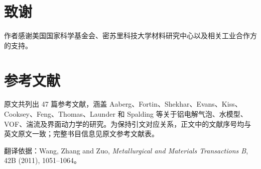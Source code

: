 \documentclass[UTF8,zihao=-4,fontset=fandol]{ctexart}
\begin{document}
\section*{致谢}
作者感谢美国国家科学基金会、密苏里科技大学材料研究中心以及相关工业合作方的支持。

\section*{参考文献}
\small 原文共列出 47 篇参考文献，涵盖 Aaberg、Fortin、Shekhar、Evans、Kiss、Cooksey、Feng、Thomas、Launder 和 Spalding 等关于铝电解气泡、水模型、VOF、湍流及界面动力学的研究。为保持引文对应关系，正文中的文献序号均与英文原文一致；完整书目信息见原文参考文献表。

\vfill\begin{center}\footnotesize 翻译依据：Wang, Zhang and Zuo, \emph{Metallurgical and Materials Transactions B}, 42B (2011), 1051--1064。\end{center}
\end{document}
